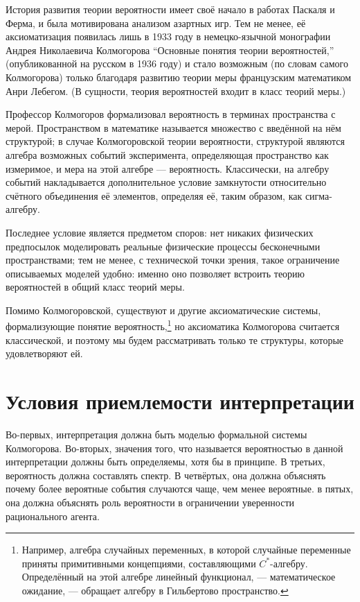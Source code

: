 \documentclass[14pt, a4paper, pdftex]{extarticle}
\begin{document}
История развития теории вероятности имеет своё начало в работах Паскаля и Ферма, и была мотивирована анализом азартных игр. Тем не менее, её аксиоматизация появилась лишь в 1933 году в немецко-язычной монографии Андрея Николаевича Колмогорова ``Основные понятия теории вероятностей,'' (опубликованной на русском в 1936 году) и стало возможным (по словам самого Колмогорова) только благодаря развитию теории меры французским математиком Анри Лебегом. (В сущности, теория вероятностей входит в класс теорий меры.)

Профессор Колмогоров формализовал вероятность в терминах пространства с мерой. Пространством в математике называется множество с введённой на нём структурой; в случае Колмогоровской теории вероятности, структурой являются алгебра возможных событий эксперимента, определяющая пространство как измеримое, и мера на этой алгебре --- вероятность. Классически, на алгебру событий накладывается дополнительное условие замкнутости относительно счётного объединения её элементов, определяя её, таким образом, как сигма-алгебру.

Последнее условие является предметом споров: нет никаких физических предпосылок моделировать реальные физические процессы бесконечными пространствами; тем не менее, с технической точки зрения, такое ограничение описываемых моделей удобно: именно оно позволяет встроить теорию вероятностей в общий класс теорий меры.

Помимо Колмогоровской, существуют и другие аксиоматические системы, формализующие понятие вероятность,\footnote{Например, алгебра случайных переменных, в которой случайные переменные приняты примитивными концепциями, составляющими $C^*$-алгебру. Определённый на этой алгебре линейный функционал, --- математическое ожидание, --- обращает алгебру в Гильбертово пространство.} но аксиоматика Колмогорова считается классической, и поэтому мы будем рассматривать только те структуры, которые удовлетворяют ей.

\section{Условия приемлемости интерпретации}

Во-первых, интерпретация должна быть моделью формальной системы Колмогорова.
Во-вторых, значения того, что называется вероятностью в данной интерпретации должны быть определяемы, хотя бы в принципе.
В третьих, вероятность должна составлять спектр.
В четвёртых, она должна объяснять почему более вероятные события случаются чаще, чем менее вероятные.
в пятых, она должна объяснять роль вероятности в ограничении уверенности рационального агента.
\end{document}
